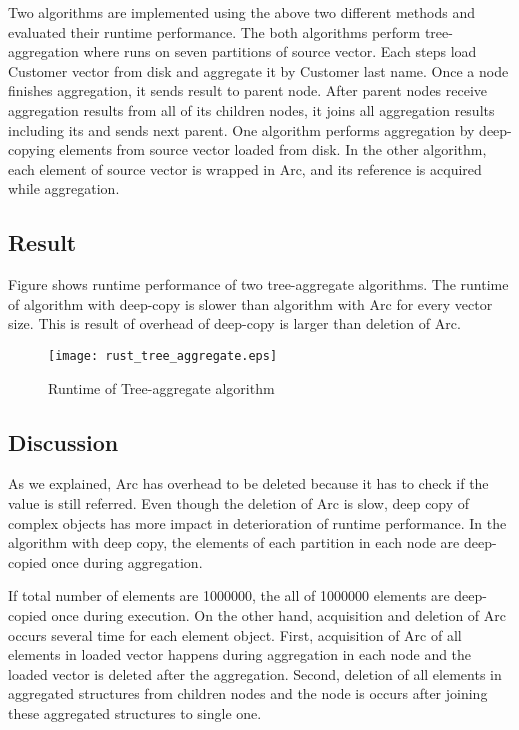 Two algorithms are implemented using the above two different methods and evaluated their runtime performance. 
The both algorithms perform tree-aggregation where runs on seven partitions of source vector. 
Each steps load Customer vector from disk and aggregate it by Customer last name. Once a node finishes aggregation, it sends result to parent node. 
After parent nodes receive aggregation results from all of its children nodes, it joins all aggregation results including its and sends next parent. 
One algorithm performs aggregation by deep-copying elements from source vector loaded from disk. In the other algorithm, each element of source vector 
is wrapped in Arc, and its reference is acquired while aggregation. 


\subsection{Result}

Figure shows runtime performance of two tree-aggregate algorithms. The runtime of algorithm with deep-copy is slower than algorithm with Arc for every vector size. 
This is result of overhead of deep-copy is larger than deletion of Arc. 

\begin{figure}[htb]
    \texttt{[image: rust\_tree\_aggregate.eps]}
    \caption{Runtime of Tree-aggregate algorithm}
    \label{fig:Sampling}
\end{figure}

\subsection{Discussion}
As we explained, Arc has overhead to be deleted because it has to check if the value is still referred. 
Even though the deletion of Arc is slow, deep copy of complex objects has more impact in deterioration of runtime performance. 
In the algorithm with deep copy, the elements of each partition in each node are deep-copied once during aggregation. 

If total number of elements are 1000000, the all of 1000000 elements are deep-copied once during execution. On the other hand, acquisition and deletion of Arc occurs several time for each element object.
First, acquisition of Arc of all elements in loaded vector happens during aggregation in each node and the loaded vector is deleted after the aggregation. 
Second, deletion of all elements in aggregated structures from children nodes and the node is occurs after joining these aggregated structures to single one. 

